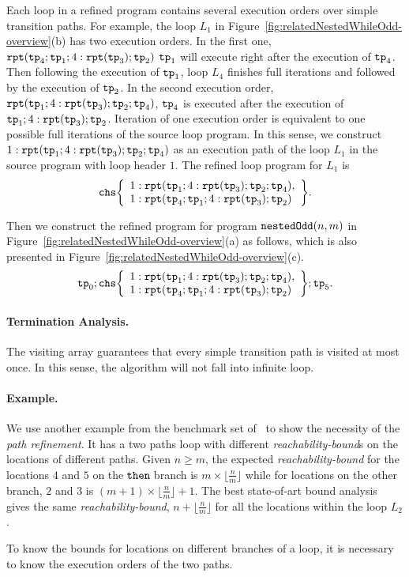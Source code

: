 Each loop in a refined program contains several execution orders over simple transition paths.
For example, the loop $L_1$ in Figure~\ref{fig:relatedNestedWhileOdd-overview}(b)
has two execution orders. In the first one,
$\mathtt{rpt}(\mathtt{tp}_4; \mathtt{tp}_1; 4:\mathtt{rpt}(\mathtt{tp}_3); \mathtt{tp}_2)$ 
$\mathtt{tp}_1$ will execute right after the execution of $\mathtt{tp}_4$.
Then following the execution of $\mathtt{tp}_1$, loop $L_4$ finishes full iterations and followed by the execution of $\mathtt{tp}_2$.
In the second execution order,
$\mathtt{rpt}(\mathtt{tp}_1; 4:\mathtt{rpt}(\mathtt{tp}_3); \mathtt{tp}_2; \mathtt{tp}_4)$,
$\mathtt{tp}_4$ is executed after the execution of $\mathtt{tp}_1; 4:\mathtt{rpt}(\mathtt{tp}_3); \mathtt{tp}_2$.
Iteration of one execution order is equivalent to one possible full iterations of the source loop program.
In this sense, we construct $1: \mathtt{rpt}(\mathtt{tp}_1; 4:\mathtt{rpt}(\mathtt{tp}_3); \mathtt{tp}_2; \mathtt{tp}_4)$ as an execution path of the loop $L_1$ in the source program with loop header $1$.
The refined loop program for $L_1$ is 
\[
\rpchoose{ 
 \begin{array}{l}
 1: \rprepeat(\tpath_1; 4:\rprepeat(\tpath_3); \tpath_2; \tpath_4), \\
 1: \rprepeat(\tpath_4; \tpath_1; 4:\rprepeat(\tpath_3); \tpath_2) 
 \end{array}
 }.
\]

Then we construct the refined program for program $\mathtt{nestedOdd}(n, m)$ in Figure~\ref{fig:relatedNestedWhileOdd-overview}(a) as follows, which is also presented in Figure~\ref{fig:relatedNestedWhileOdd-overview}(c).
\[
 \tpath_0 ; \rpchoose{ 
 \begin{array}{l}
    1: \rprepeat(\tpath_1; 4:\rprepeat(\tpath_3); \tpath_2; \tpath_4), \\
    1: \rprepeat(\tpath_4; \tpath_1; 4:\rprepeat(\tpath_3); \tpath_2) 
 \end{array}
 }; \tpath_5.
\]


\paragraph{Termination Analysis.}
The visiting array guarantees that every simple transition path is visited at most once.
In this sense, the algorithm will not fall into infinite loop.


\paragraph{Example.}
We use another example from the benchmark set of~\cite{GulwaniJK09} to show the necessity of the \emph{path refinement}. 
It has a two paths loop
with different \emph{reachability-bound}s on the locations of different paths.
%
Given $n \geq m$,
the expected \emph{reachability-bound} for the locations $4$ and $5$ on the$\mathtt{\;then\;}$branch is $m \times \lfloor\frac{n}{m}\rfloor$
while for locations on the other branch, $2$ and $3$ is $(m + 1) \times \lfloor\frac{n}{m}\rfloor + 1$. 
The best state-of-art bound analysis
gives the same \emph{reachability-bound}, $n + \lfloor\frac{n}{m}\rfloor$ for all the locations within the loop $L_2$.

To know the bounds for locations on different branches of a loop, 
it is necessary to know the execution orders of the two paths.

